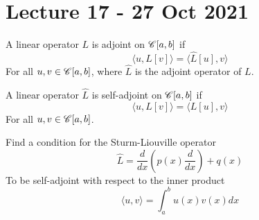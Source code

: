 \section{Lecture 17 - 27 Oct 2021}
\begin{definition}
  A linear operator $L$ is adjoint on $\mathscr C[a,b]$ if
  \[\langle u,L[v] \rangle =\langle \hat{L}[u],v \rangle \]
  For all $u,v\in\mathscr C[a,b]$, where $\hat{L}$ is the adjoint operator of $L$.
  \label{<+label+>}
\end{definition}
\begin{definition}
  A linear operator $\hat{L}$ is self-adjoint on $\mathscr C[a,b]$ if 
  \[\langle u,L[v] \rangle =\langle L[u], v \rangle \]
  For all $u,v\in\mathscr C[a,b]$.
  \label{<+label+>}
\end{definition}

\begin{example}
  Find a condition for the Sturm-Liouville operator
  \[\hat{L}=\frac{d}{dx}(p(x)\frac{d}{dx}) + q(x)\]
  To be self-adjoint with respect to the inner product
  \[\langle u,v \rangle =\int_a^b u(x)v(x)dx \]
\end{example}
